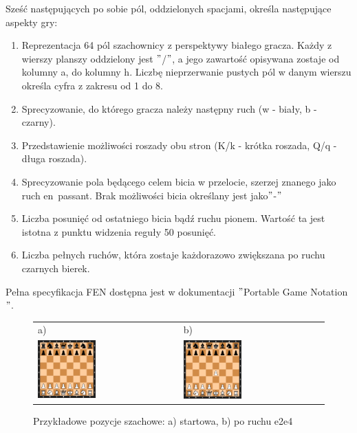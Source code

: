 Sześć następujących po sobie pól, oddzielonych spacjami, określa następujące aspekty gry:
\begin{enumerate}
    \item Reprezentacja 64 pól szachownicy z perspektywy białego gracza.
    Każdy z wierszy planszy oddzielony jest \("\)/\("\), a jego zawartość opisywana zostaje od kolumny a, do kolumny h.
    Liczbę nieprzerwanie pustych pól w danym wierszu określa cyfra z zakresu od 1 do 8.
    \item Sprecyzowanie, do którego gracza należy następny ruch (w - biały, b - czarny).
    \item Przedstawienie możliwości roszady obu stron (K/k - krótka roszada, Q/q - długa roszada).
    \item Sprecyzowanie pola będącego celem bicia w przelocie, szerzej znanego jako ruch en~passant.
    Brak możliwości bicia określany jest jako\("\)-\("\)
    \item Liczba posunięć od ostatniego bicia bądź ruchu pionem.
    Wartość ta jest istotna z punktu widzenia reguły 50 posunięć.
    \item Liczba pełnych ruchów, która zostaje każdorazowo zwiększana po ruchu czarnych bierek.
\end{enumerate}

Pełna specyfikacja FEN dostępna jest w dokumentacji \("\)Portable Game Notation\("\). \cite*{PGNdoc}

\begin{figure}[htb]
    \centering
    \begin{tabular}{@{}ll@{}}
        a) & b) \\
        \includegraphics[width=0.425\textwidth]{rozdzialy/rozdzial01/1_komunikacja-z-systemem/rysunki/pozycja_startowa}
        &
        \includegraphics[width=0.425\textwidth]{rozdzialy/rozdzial01/1_komunikacja-z-systemem/rysunki/pozycja_startowa_e2e4}
    \end{tabular}
    \caption{Przykładowe pozycje szachowe: a) startowa, b) po ruchu e2e4}
    \label{fig: basic_chess_positions}
\end{figure}

